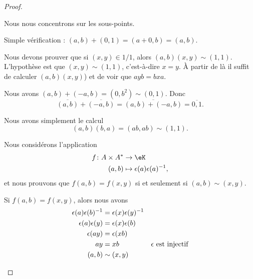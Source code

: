 \begin{proof}
\begin{subproof}
		Nous nous concentrons sur les sous-points.

		\begin{subproof}
			Simple vérification  : \( (a,b)+(0,1)=(a+0,b)=(a,b)\).


			Nous devons prouver que si \( (x,y)\in 1/1\), alors \( (a,b)(x,y)\sim(1,1)\). L'hypothèse est que \( (x,y)\sim (1,1)\), c'est-à-dire \( x=y\). À partir de là il suffit de calculer \( (a,b)(x,y)\)) et de voir que \( ayb=bxa\).

			Nous avons \( (a,b)+(-a,b)=(0,b^2)\sim (0,1)\). Donc
			\begin{equation}
				\overline{(a,b)}+\overline{(-a,b)}=\overline{(a,b)+(-a,b)}=\overline{0,1}.
			\end{equation}

			Nous avons simplement le calcul
			\begin{equation}
				(a,b)(b,a)=(ab,ab)\sim (1,1).
			\end{equation}
		\end{subproof}

		\spitem[Morphisme de corps]
		Nous considérons l'application
		\begin{equation}
			\begin{aligned}
				f\colon A\times A^* & \to \eK                              \\
				(a,b)               & \mapsto \epsilon(a)\epsilon(a)^{-1},
			\end{aligned}
		\end{equation}
		et nous prouvons que \( f(a,b)=f(x,y)\) si et seulement si \( (a,b)\sim(x,y)\).

		\begin{subproof}
			\spitem[\( \Rightarrow\)]
			Si \( f(a,b)=f(x,y)\), alors nous avons
			\begin{subequations}
				\begin{align}
					\epsilon(a)\epsilon(b)^{-1} & =\epsilon(x)\epsilon(y)^{-1}                                     \\
					\epsilon(a)\epsilon(y)      & =\epsilon(x)\epsilon(b)                                          \\
					\epsilon(ay)                & =\epsilon(xb)                                                    \\
					ay                          & =xb                          & \text{\( \epsilon\) est injectif} \\
					(a,b)                       & \sim(x,y)
				\end{align}
			\end{subequations}


\end{subproof}
\end{subproof}
\end{proof}
